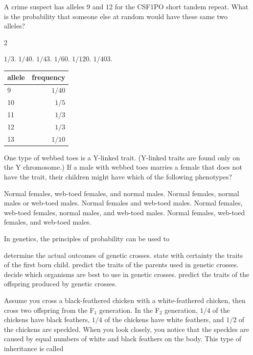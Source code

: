 
\question
A crime suspect has alleles 9 and 12 for the CSF1PO short tandem repeat. What is the probability that someone else at random would have these same two alleles?  

\begin{multicols}{2}
\begin{choices}
\choice $1/3$.
\choice $1/40$.
\choice $1/43$.
\correctchoice $1/60$.
\choice $1/120$.
\choice $1/403$.
\end{choices}
\columnbreak
\begin{tabular}{lr}
\toprule
allele & frequency\\
\midrule
9 & $1/40$\\
10 & $1/5$\\
11 & $1/3$\\
12 & $1/3$\\
13 & $1/10$\\
\bottomrule
\end{tabular}
\end{multicols}

\question
One type of webbed toes is a Y-linked trait. (Y-linked traits are found only on the Y chromosome.) If a male with webbed toes marries a female that does not have the trait, their children might have which of the following phenotypes?

\begin{choices}
\choice Normal females, web-toed females, and normal males.
\choice Normal females, normal males or web-toed males.
\correctchoice Normal females and web-toed males.
\choice Normal females, web-toed females, normal males, and web-toed males.
\choice Normal females, web-toed females, and web-toed males.
\end{choices}

\question
In genetics, the principles of probability can be used to

\begin{choices}
\choice determine the actual outcomes of genetic crosses.
\choice state with certainty the traits of the first born child.
\choice predict the traits of the parents used in genetic crosses.
\choice decide which organisms are best to use in genetic crosses.
\correctchoice predict the traits of the offspring produced by genetic crosses.
\end{choices}

\question
Assume you cross a black-feathered chicken with a white-feathered chicken, then cross two offspring from the F$_1$ generation.  In the F$_2$ generation, $1/4$ of the chickens have black feathers, $1/4$ of the chickens have white feathers, and $1/2$ of the chickens are speckled.  When you look closely, you notice that the speckles are caused by equal numbers of white and black feathers on the body. This type of inheritance is called

